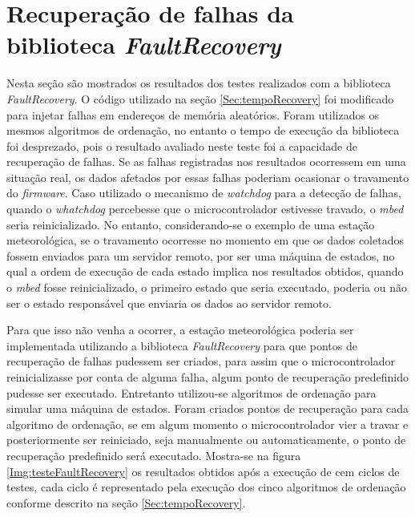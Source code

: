 \newpage
\section{Recuperação de falhas da biblioteca \textit{FaultRecovery}}\label{Sec:recupeFault}

Nesta seção são mostrados os resultados dos testes realizados com a biblioteca \textit{FaultRecovery}. O código utilizado na seção \ref{Sec:tempoRecovery} foi modificado para injetar falhas em endereços de memória aleatórios. Foram utilizados os mesmos algoritmos de ordenação, no entanto o tempo de execução da biblioteca foi desprezado, pois o resultado avaliado neste teste foi a capacidade de recuperação de falhas. Se as falhas registradas nos resultados ocorressem em uma situação real, os dados afetados por essas falhas poderiam ocasionar o travamento do \textit{firmware}. Caso utilizado o mecanismo de \textit{watchdog} para a detecção de falhas, quando o \textit{whatchdog} percebesse que o microcontrolador estivesse travado, o \textit{mbed} seria reinicializado. No entanto, considerando-se o exemplo de uma estação meteorológica, se o travamento ocorresse no momento em que os dados coletados fossem enviados para um servidor remoto, por ser uma máquina de estados, no qual a ordem de execução de cada estado implica nos resultados obtidos, quando o \textit{mbed} fosse reinicializado, o primeiro estado que seria executado, poderia ou não ser o estado responsável que enviaria os dados ao servidor remoto.

Para que isso não venha a ocorrer, a estação meteorológica poderia ser implementada utilizando a biblioteca \textit{FaultRecovery} para que pontos de recuperação de falhas pudessem ser criados, para assim que o microcontrolador reinicializasse por conta de alguma falha, algum ponto de recuperação predefinido pudesse ser executado. Entretanto utilizou-se algoritmos de ordenação para simular uma máquina de estados. Foram criados pontos de recuperação para cada algoritmo de ordenação, se em algum momento o microcontrolador vier a travar e posteriormente ser reiniciado, seja manualmente ou automaticamente, o ponto de recuperação predefinido será executado. Mostra-se na figura \ref{Img:testeFaultRecovery} os resultados obtidos após a execução de cem ciclos de testes, cada ciclo é representado pela execução dos cinco algoritmos de ordenação conforme descrito na seção \ref{Sec:tempoRecovery}. 



